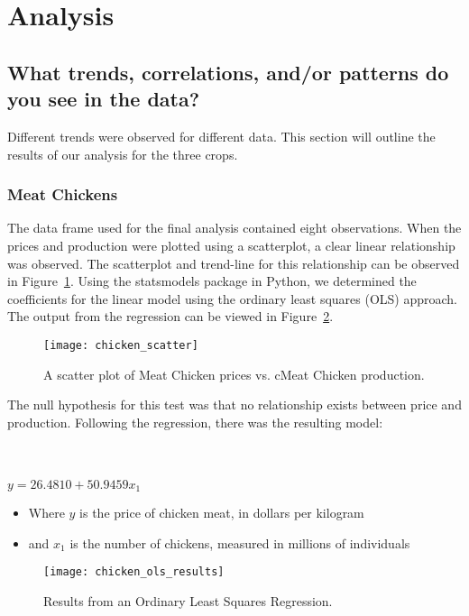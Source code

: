 \section{Analysis}

\subsection{What trends, correlations, and/or patterns do you see in the data?}

Different trends were observed for different data. This section will outline the results of our analysis for the three crops.

\subsubsection{Meat Chickens}

The data frame used for the final analysis contained eight observations.
When the prices and production were plotted using a scatterplot, a clear linear relationship was observed.
The scatterplot and trend-line for this relationship can be observed in Figure~\ref{fig:chicken_scatter}.
Using the statsmodels package in Python, we determined the coefficients for the linear model using the ordinary least squares (OLS) approach.
The output from the regression can be viewed in Figure~\ref{fig:chicken_ols}.

\begin{figure}
    \texttt{[image: chicken\_scatter]}
    \caption{A scatter plot of Meat Chicken prices vs. cMeat Chicken production.}
    \label{fig:chicken_scatter}
\end{figure}

The null hypothesis for this test was that no relationship exists between price and production.
Following the regression, there was the resulting model:

\\~\\

\tabto{5cm} $y = 26.4810 + 50.9459x_1$


\begin{itemize}
    \item Where $y$ is the price of chicken meat, in dollars per kilogram
    \item and $x_1$ is the number of chickens, measured in millions of individuals
\end{itemize}

\begin{figure}
    \texttt{[image: chicken\_ols\_results]}
    \caption{Results from an Ordinary Least Squares Regression.}
    \label{fig:chicken_ols}
\end{figure}

